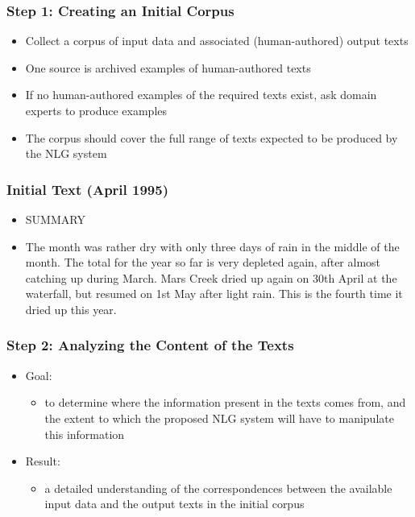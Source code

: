 \documentclass[compress,color=usenames]{beamer}
\begin{document}
\begin{frame}
\frametitle{Step 1: Creating an Initial Corpus}

\label{f82}
\begin{itemize}
\item { {Collect a corpus of input data and associated (human-authored) output texts}}
\item { {One source is archived examples of human-authored texts}}
\item { {If no human-authored examples of the required texts exist, ask domain experts to produce examples}}
\item { {The corpus should cover the full range of texts expected to be produced by the NLG system}}
\end{itemize}

\end{frame}

\begin{frame}
\frametitle{Initial Text (April 1995)}

\label{f84}
\begin{itemize}
\item { {SUMMARY}}
\item { {The month was rather dry with only three days of rain in the middle of the month. The total for the year so far is very depleted again, after almost catching up during March. Mars Creek dried up again on 30th April at the waterfall, but resumed on 1st May after light rain. This is the fourth time it dried up this year.}}
\end{itemize}

\end{frame}

\begin{frame}
\frametitle{Step 2: Analyzing the Content of the Texts}

\label{f86}
\begin{itemize}
\item { {Goal: }}
\begin{itemize}
\item to determine where the information present in the texts comes from, and the extent to which the proposed NLG system will have to manipulate this information
\end{itemize}
\item { {Result: }}
\begin{itemize}
\item a detailed understanding of the correspondences between the available input data and the output texts in the initial corpus
\end{itemize}
\end{itemize}


\end{frame}
\end{document}
